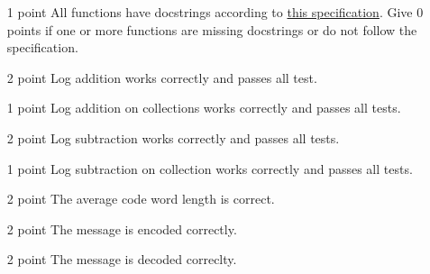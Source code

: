 \documentclass[11pt, leqno, a4paper]{article}
\begin{document}
\begin{itemize}
\item[1 point] All functions have docstrings according to \href{https://www.python.org/dev/peps/pep-0257/}{this specification}. Give 0 points if one or more
functions are missing docstrings or do not follow the specification.
\item[2 point] Log addition works correctly and passes all test.
\item[1 point] Log addition on collections works correctly and passes all tests.
\item[2 point] Log subtraction works correctly and passes all tests.
\item[1 point] Log subtraction on collection works correctly and passes all tests.
\item[2 point] The average code word length is correct.
\item[2 point] The message is encoded correctly.
\item[2 point] The message is decoded correclty.
\end{itemize}
\end{document}
